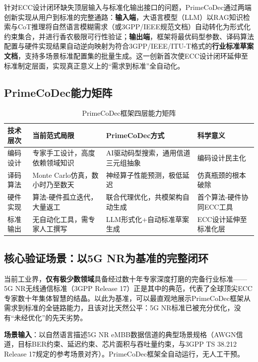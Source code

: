 针对ECC设计闭环缺失顶层输入与标准化输出接口的问题，PrimeCoDec通过两端创新实现从用户到标准的完整通路：\textbf{输入端}，大语言模型（LLM）以RAG知识检索与CoT推理将自然语言模糊需求（或3GPP/IEEE规范文档）自动转化为形式化约束集合，并进行香农极限可行性验证；\textbf{输出端}，框架将最优码型参数、译码算法配置与硬件实现结果自动逆向映射为符合3GPP/IEEE/ITU-T格式的\textbf{行业标准草案文档}，支持多场景标准配置集的批量生成。这一创新首次使ECC设计闭环延伸至标准制定层面，实现真正意义上的``需求到标准''全自动化。

\subsection{PrimeCoDec能力矩阵}

\begin{table}[htbp]
\centering
\caption{PrimeCoDec框架四层能力矩阵}
\label{tab:capability}
\setlength{\tabcolsep}{4pt}
\begin{tabular}{@{}L{2.8cm}L{3.5cm}L{3.5cm}L{3.0cm}@{}}
\toprule
\textbf{技术层次} & \textbf{当前范式局限} & \textbf{PrimeCoDec方式} & \textbf{科学意义} \\
\midrule
编码设计 & 专家手工设计，高度依赖领域知识 & AI驱动码型搜索，通用信道三元组抽象 & 编码设计民主化 \\
译码算法 & Monte Carlo仿真，数小时乃至数天 & 神经算子性能预测，极低延迟 & 仿真瓶颈的根本破除 \\
硬件实现 & 算法-硬件孤立迭代，大量返工 & 联合代理优化，共模架构自动生成 & 首个算法-硬件协同ECC工具 \\
标准输出 & 无自动化工具，需专家人工撰写 & LLM形式化+自动标准草案生成 & ECC设计延伸至标准化层 \\
\bottomrule
\end{tabular}
\end{table}

\subsection{核心验证场景：以5G NR为基准的完整闭环}\label{sec:5gnr_case}

当前工业界，\textbf{仅有极少数领域}具备经过数十年专家深度打磨的完备行业标准——5G NR无线通信标准（3GPP Release 17\cite{3gpp38212}）正是其中的典范，代表了全球顶尖ECC专家数十年集体智慧的结晶。以此为基准，可以最直观地展示PrimeCoDec框架从需求到标准的全链路能力，且该对比天然公平：5G NR标准已被充分优化，没有``未经优化''的先天劣势。

\textbf{场景输入}：以自然语言描述5G NR eMBB数据信道的典型场景规格（AWGN信道，目标BER约束、延迟约束、芯片面积与吞吐量约束，与3GPP TS 38.212 Release 17规定的参考场景对齐）。PrimeCoDec框架全自动运行，无人工干预。

